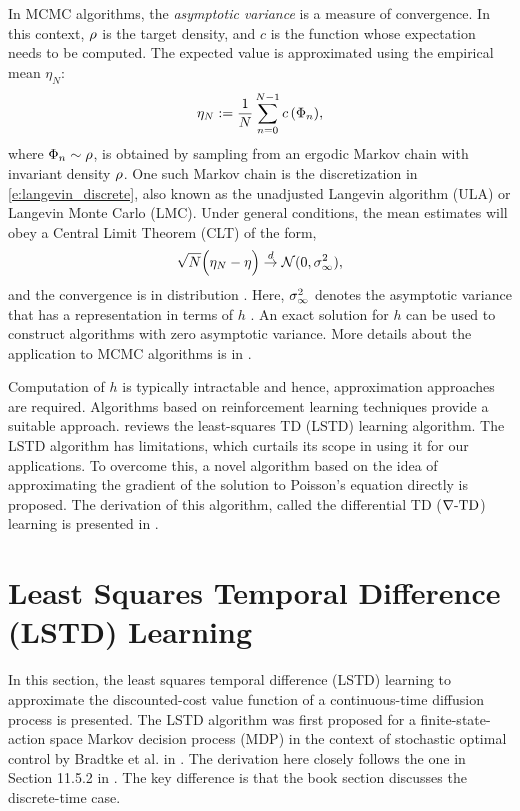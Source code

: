 In MCMC algorithms, the \textit{asymptotic variance} is a measure of convergence. In this context, $\rho$ is the target density, and $c$ is the function whose expectation needs to be computed. The expected value is approximated using the empirical mean $\eta_N$:
\begin{equation} \eta_N := \frac{1}{N} \sum_{n=0}^{N-1} c\,(\Phi_n),\end{equation}
where $\Phi_n \sim \rho$, is obtained by sampling from an ergodic Markov chain with invariant density $\rho$. One such Markov chain is the discretization in \eqref{e:langevin_discrete}, also known as the unadjusted Langevin algorithm (ULA) or Langevin Monte Carlo (LMC). Under general conditions, the mean estimates will obey a Central Limit Theorem (CLT) of the form,
\begin{equation}
\sqrt{N} \Bigl( \eta_N - \eta \Bigr) \overset{d}{\to} \mathcal{N}(0,\sigma_\infty ^2),
\end{equation}
and the convergence is in distribution \cite{MT,bha82}. Here, $\sigma_\infty^2$ denotes the asymptotic variance that has a representation in terms of $h$ \cite{glymey96a,MT,asmgly07}. An exact solution for $h$ can be used to construct algorithms with zero asymptotic variance. More details about the application to MCMC algorithms is in . 

Computation of $h$ is typically intractable and hence, approximation approaches are required. Algorithms based on reinforcement learning techniques provide a suitable approach.  reviews the least-squares TD (LSTD) learning algorithm. The LSTD algorithm has limitations, which curtails its scope in using it for our applications. To overcome this, a novel algorithm based on the idea of approximating the gradient of the solution to Poisson's equation directly is proposed. The derivation of this algorithm, called the differential TD ($\nabla\text{-TD}$) learning is presented in . 

\section{Least Squares Temporal Difference (LSTD) Learning} 
\label{s:lstd}
In this section, the least squares temporal difference (LSTD) learning to approximate the discounted-cost value function of a continuous-time diffusion process is presented.  The LSTD algorithm was first proposed for a finite-state-action space Markov decision process (MDP) in the context of stochastic optimal control  by Bradtke et al. in \cite{brabar96}. The derivation here closely follows the one in Section 11.5.2 in \cite{ctcn}. The key difference is that the book section discusses the discrete-time case. 


